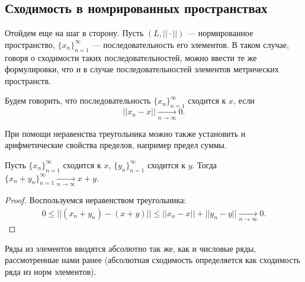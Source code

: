 \subsection{Сходимость в номрированных пространствах}
Отойдем еще на шаг в сторону. Пусть $(L, ||\cdot||)$ --- нормированное пространство, $\{x_n\}_{n=1}^{\infty}$ --- последовательность его элементов. В таком случае, говоря о сходимости таких последовательностей, можно ввести те же формулировки, что и в случае последовательностей элементов метрических пространств.
\begin{Def}
    Будем говорить, что последовательность $\{x_n\}_{n=1}^{\infty}$ сходится к $x$, если 
    $$
        ||x_n - x|| \underset{n\to \infty}{\to} 0.
    $$
\end{Def}
При помощи неравенства треугольника можно также установить и арифметические свойства пределов, например предел суммы.
\begin{Statement}
    Пусть $\{x_n\}_{n=1}^{\infty}$ сходится к $x$, $\{y_n\}_{n=1}^{\infty}$ сходится к $y$. Тогда  $\{x_n + y_n\}_{n=1}^{\infty} \underset{n\to \infty}{\to} x+y$.
\end{Statement}
\begin{proof}
    Воспользуемся неравенством треугольника:
    \begin{gather*}
        0\leqslant ||(x_n + y_n) - (x + y)|| \leqslant ||x_n-x|| + ||y_n - y|| \underset{n\to\infty}{\to} 0.
    \end{gather*}
\end{proof}
Ряды из элементов вводятся абсолютно так же, как и числовые ряды, рассмотренные нами ранее (абсолютная сходимость определяется как сходимость ряда из норм элементов).

